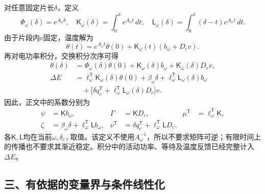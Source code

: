 对任意固定片长\(\delta\)，定义
\begin{equation}
\Phi_\omega(\delta)=e^{A_\omega\delta},\quad
\mathsf K_\omega(\delta)=\int_0^\delta e^{A_\omega t}\,dt,\quad
\mathsf L_\omega(\delta)=\int_0^\delta(\delta-t)e^{A_\omega t}\,dt.
\label{eq:matrix-integrals}
\end{equation}
由于片段内\(v\)固定，温度解为
\begin{equation}
\theta(t)=e^{A_\omega t}\theta(0)
+\mathsf K_\omega(t)(b_\omega+D_cv).
\label{eq:segment-solution}
\end{equation}
再对电功率积分，交换积分次序可得
\begin{equation}
\begin{aligned}
\theta(\delta)&=\Phi_\omega(\delta)\theta(0)
+\mathsf K_\omega(\delta)b_\omega+\mathsf K_\omega(\delta)D_cv,\\
\Delta E&=\ell_\omega^{\mathsf T}\mathsf K_\omega(\delta)\theta(0)
+\beta_\omega\delta+\ell_\omega^{\mathsf T}\mathsf L_\omega(\delta)b_\omega\\
&\quad+\bigl[\delta q_c^{\mathsf T}
+\ell_\omega^{\mathsf T}\mathsf L_\omega(\delta)D_c\bigr]v.
\end{aligned}
\label{eq:segment-integrals}
\end{equation}
因此，正文中的系数分别为
\begin{equation}
\begin{aligned}
\psi&=\mathsf K b_\omega,& \Gamma&=\mathsf K D_c,&
\mu^{\mathsf T}&=\ell_\omega^{\mathsf T}\mathsf K,\\
\zeta&=\beta_\omega\delta+\ell_\omega^{\mathsf T}\mathsf Lb_\omega,&
\nu^{\mathsf T}&=\delta q_c^{\mathsf T}+\ell_\omega^{\mathsf T}\mathsf LD_c.
\end{aligned}
\label{eq:integral-coefficients}
\end{equation}
各\(\mathsf K,\mathsf L\)均在当前\(\omega,\delta_{c\ell}\)取值。该定义不使用\(A_\omega^{-1}\)，所以不要求矩阵可逆；有限时间上的传播也不要求其渐近稳定。积分中的活动功率、等待及温度反馈已经完整计入\(\Delta E\)。

\subsection*{三、有依据的变量界与条件线性化}

